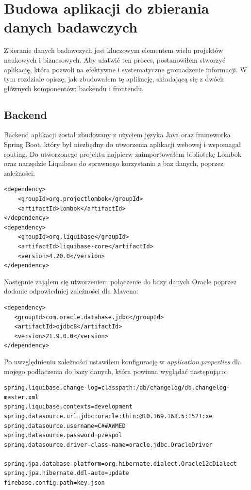 \chapter{Budowa aplikacji do zbierania danych badawczych}

Zbieranie danych badawczych jest kluczowym elementem wielu projektów naukowych i biznesowych. Aby ułatwić ten proces, postanowiłem stworzyć aplikację, która pozwoli na efektywne i systematyczne gromadzenie informacji. W tym rozdziale opiszę, jak zbudowałem tę aplikację, składającą się z dwóch głównych komponentów: backendu i frontendu.

\section{Backend}

Backend aplikacji został zbudowany z użyciem języka Java oraz frameworka Spring Boot, który był niezbędny do utworzenia aplikacji webowej i wspomagał routing.
Do utworzonego projektu najpierw zaimportowałem bibliotekę Lombok oraz narzędzie Liquibase do sprawnego korzystania z baz danych, poprzez zależności:
\begin{lstlisting}
<dependency>
    <groupId>org.projectlombok</groupId>
    <artifactId>lombok</artifactId>
</dependency>
<dependency>
    <groupId>org.liquibase</groupId>
    <artifactId>liquibase-core</artifactId>
    <version>4.20.0</version>
</dependency>      
\end{lstlisting}

Następnie zająłem się utworzeniem połączenie do bazy danych Oracle poprzez dodanie odpowiedniej zależności dla Mavena:
\begin{lstlisting}
<dependency>
   <groupId>com.oracle.database.jdbc</groupId>
   <artifactId>ojdbc8</artifactId>
   <version>21.9.0.0</version>
</dependency>
\end{lstlisting}
Po uwzględnieniu zależności ustawiłem konfigurację w \textit{application.properties} dla mojego podłączenia do bazy danych, która powinna wyglądać następująco:

\begin{lstlisting}
spring.liquibase.change-log=classpath:/db/changelog/db.changelog-master.xml
spring.liquibase.contexts=development
spring.datasource.url=jdbc:oracle:thin:@10.169.168.5:1521:xe
spring.datasource.username=C##AWMED
spring.datasource.password=pzespol
spring.datasource.driver-class-name=oracle.jdbc.OracleDriver

spring.jpa.database-platform=org.hibernate.dialect.Oracle12cDialect
spring.jpa.hibernate.ddl-auto=update
firebase.config.path=key.json
\end{lstlisting}

